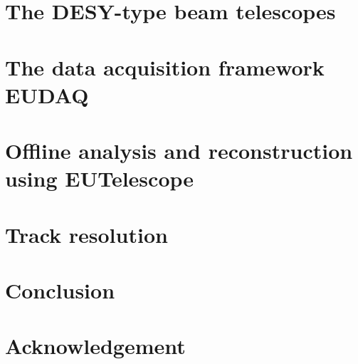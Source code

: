 \documentclass[a4paper,10pt]{scrartcl}
\newcommand{\eudaq}{EUDAQ }
\begin{document}
\section{The DESY-type beam telescopes}
\label{sec:tscope}


\section{The data acquisition framework \eudaq}
\label{sec:eudaq}


\section{Offline analysis and reconstruction using EUTelescope}
\label{sec:offline}


\section{Track resolution}
\label{sec:trackres}


\section{Conclusion}
\label{sec:conclusion}



\section*{Acknowledgement}

\small


\end{document}
